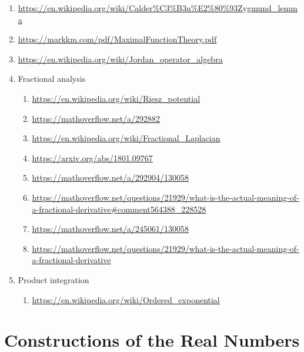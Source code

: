 \begin{enumerate}
    \item \url{https://en.wikipedia.org/wiki/Calder\%C3\%B3n\%E2\%80\%93Zygmund_lemma}
    \item \url{https://markkm.com/pdf/MaximalFunctionTheory.pdf}
    \item \url{https://en.wikipedia.org/wiki/Jordan_operator_algebra}
    \item Fractional analysis
        \begin{enumerate}
            \item \url{https://en.wikipedia.org/wiki/Riesz_potential}
            \item \url{https://mathoverflow.net/a/292882}
            \item \url{https://en.wikipedia.org/wiki/Fractional_Laplacian}
            \item \url{https://arxiv.org/abs/1801.09767}
            \item \url{https://mathoverflow.net/a/292904/130058}
            \item \url{https://mathoverflow.net/questions/21929/what-is-the-actual-meaning-of-a-fractional-derivative#comment564388_228528}
            \item \url{https://mathoverflow.net/a/245061/130058}
            \item \url{https://mathoverflow.net/questions/21929/what-is-the-actual-meaning-of-a-fractional-derivative}
        \end{enumerate}
    \item Product integration
        \begin{enumerate}
            \item \url{https://en.wikipedia.org/wiki/Ordered_exponential}
        \end{enumerate}
\end{enumerate}

\section{Constructions of the Real Numbers}\label{section-constructions-of-the-real-numbers}
